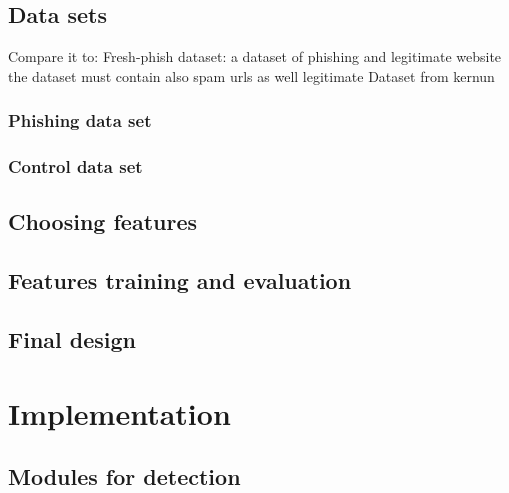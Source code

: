 \documentclass[
  digital, %
  oneside, %
  table,   %
  nolof,     %
  nolot,     %
]{fithesis3}
\newcounter{feature}
\begin{document}
\section{Data sets}
\cite{fresh-phish}

Compare it to: Fresh-phish dataset: a
dataset of phishing and legitimate website
the dataset must contain also spam urls as well legitimate
Dataset from kernun
\subsection{Phishing data set}
\subsection{Control data set}
\section{Choosing features}
\section{Features training and evaluation}

\section{Final design}

\chapter{Implementation}






\section{Modules for detection}
\end{document}
